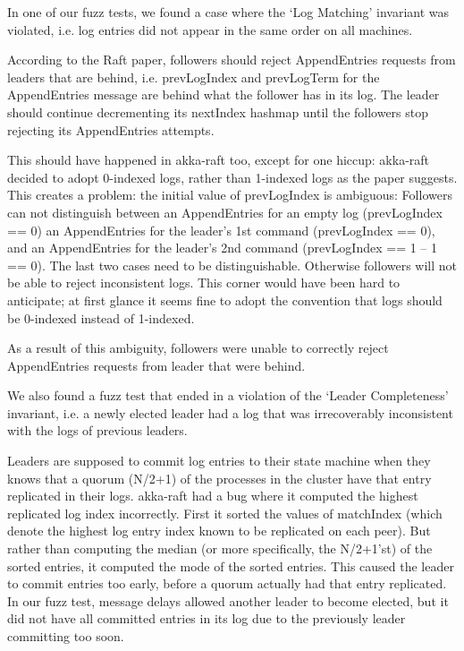 In one of our fuzz tests,
 we found a case where the `Log Matching' invariant was violated, i.e. log entries did not appear in the same order on all machines.

According to the Raft paper, followers should reject AppendEntries requests from leaders that are behind,
 i.e. prevLogIndex and prevLogTerm for the AppendEntries message are behind what the follower has in its log.
 The leader should continue decrementing its nextIndex hashmap until the followers stop rejecting its AppendEntries attempts.

This should have happened in akka-raft too, except for one hiccup: akka-raft decided to adopt 0-indexed logs,
 rather than 1-indexed logs as the paper suggests. This creates a problem: the initial value of prevLogIndex is ambiguous:
Followers can not distinguish between an AppendEntries for an empty log (prevLogIndex == 0)
an AppendEntries for the leader's 1st command (prevLogIndex == 0), and
an AppendEntries for the leader's 2nd command (prevLogIndex == 1 – 1 == 0).
The last two cases need to be distinguishable. Otherwise followers will not be able to reject inconsistent logs. This corner would have been hard to anticipate; at first glance it seems fine to adopt the convention that logs should be 0-indexed instead of 1-indexed.

As a result of this ambiguity, followers were unable to correctly reject AppendEntries requests from leader that were behind.

 We also found a fuzz test that
 ended in a violation of the `Leader Completeness' invariant, i.e. a newly elected leader
 had a log that was irrecoverably inconsistent with the logs of previous leaders.

Leaders are supposed to commit log entries to their state machine when they knows that
 a quorum (N/2+1) of the processes in the cluster have that entry replicated in their logs.
 akka-raft had a bug where it computed the highest replicated log index incorrectly.
 First it sorted the values of matchIndex (which denote the highest log entry index known
 to be replicated on each peer). But rather than computing the median (or more specifically,
 the N/2+1'st) of the sorted entries, it computed the mode of the sorted entries.
 This caused the leader to commit entries too early, before a quorum actually had that entry
 replicated. In our fuzz test, message delays allowed another leader to become elected, but
 it did not have all committed entries in its log due to the previously leader committing too soon.

